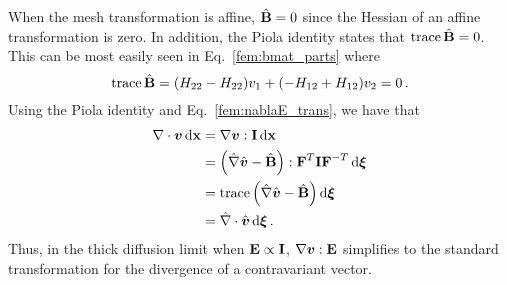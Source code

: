 \documentclass[../doc.tex]{subfiles}
\begin{document}
When the mesh transformation is affine, $\hmat{B} = 0$ since the Hessian of an affine transformation is zero. In addition, the Piola identity states that $\tr\hmat{B} = 0$. This can be most easily seen in Eq.~\ref{fem:bmat_parts} where 
	\begin{equation}
		\tr\hmat{B} = (H_{22} - H_{22}) v_1 + (-H_{12} + H_{12}) v_2 = 0 \,. 
	\end{equation}
Using the Piola identity and Eq.~\ref{fem:nablaE_trans}, we have that 
	\begin{equation}
	\begin{aligned}
		\nabla\cdot\vec{v} \ud \x &= \nabla\vec{v} : \I \ud \x \\
		&= \paren{\hnabla\hvec{v} - \hmat{B}} : \mat{F}^T\I\mat{F}^{-T} \ud \vec{\xi} \\
		&= \tr\paren{\hnabla\hvec{v} - \hmat{B}} \ud \vec{\xi} \\
		&= \hnabla\cdot\hvec{v} \ud \vec{\xi} \,. 
	\end{aligned}
	\end{equation}
Thus, in the thick diffusion limit when $\E \propto \I$, $\nabla\vec{v} : \E$ simplifies to the standard transformation for the divergence of a contravariant vector.
\end{document}

